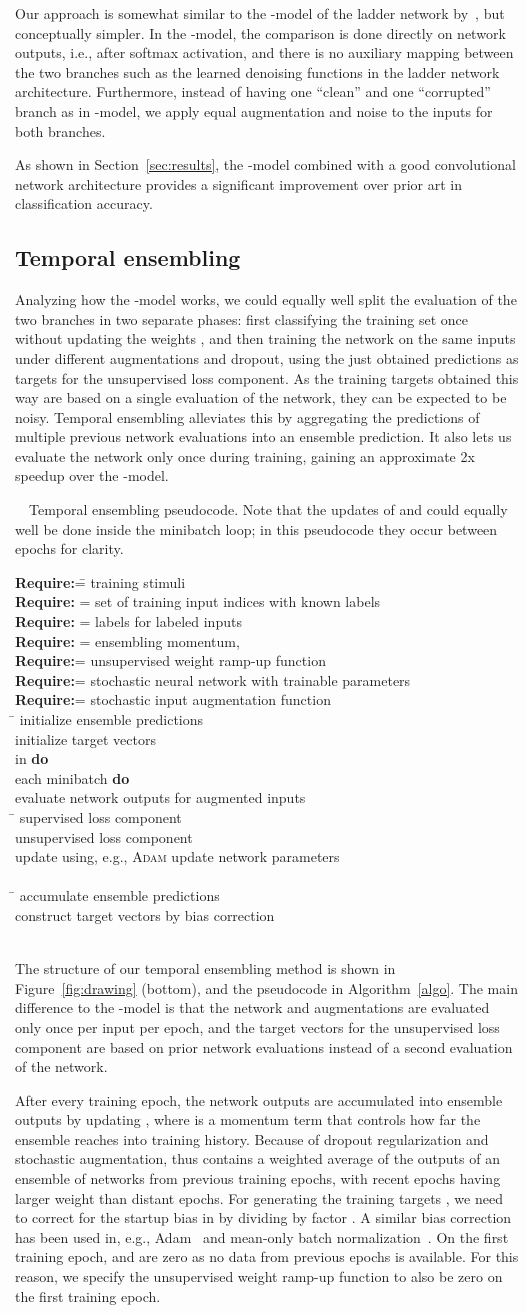 \documentclass{article}
\newcommand{\Req}{\textbf{Require:}\hspace*{0.5em}}
\newcommand{\X}{\hspace*{3mm}}
\newcommand{\XX}{\X\X}
\newcommand{\XXX}{\X\X\X}
\newcommand{\cm}[1]{ #1}
\newcommand{\figalgo}{
\begin{algorithm}[t]
\caption{\label{algo}\ \ 
Temporal ensembling pseudocode. 
Note that the updates of  and  could equally well
be done inside the minibatch loop; in this pseudocode they occur between epochs for clarity.
}
\begin{tabbing}
\Req          \= = training stimuli \hspace*{25mm} \= \\
\Req            \> = set of training input indices with known labels \\
\Req          \> = labels for labeled inputs  \\
\Req       \> = ensembling momentum,  \\
\Req            = unsupervised weight ramp-up function \\
\Req     = stochastic neural network with trainable parameters  \\
\Req            = stochastic input augmentation function \\
\X     \=  \hspace*{5mm}                   \>   \cm{initialize ensemble predictions} \\
\X  \>                                  \>   \cm{initialize target vectors} \\
\X {\bf for}  in  {\bf do} \\
\XX {\bf for} each minibatch  {\bf do} \\
\XXX                            \>\> \cm{evaluate network outputs for augmented inputs} \\
\XXX \=  \>   \cm{supervised loss component} \\
\XXX \>                  \>   \cm{unsupervised loss component} \\
\XXX update  using, e.g., \textsc{Adam}                                \>\> \cm{update network parameters} \\
\XX {\bf end for} \\
\XX \=                                      \>   \cm{accumulate ensemble predictions} \\
\XX \>                                       \>   \cm{construct target vectors by bias correction} \\
\X {\bf end for}\\
\X {\bf return} 
\end{tabbing}
\vspace*{-1.5mm}
\end{algorithm}
}
\begin{document}
Our approach is somewhat similar to the -model of the ladder network by~\cite{ladder}, but
conceptually simpler. In the -model, the comparison is done directly on network
outputs, i.e., after softmax activation, and there is no auxiliary mapping between the two branches such as
the learned denoising functions in the ladder network architecture.
Furthermore, instead of having one ``clean'' and one ``corrupted'' branch as in -model, we apply
equal augmentation and noise to the inputs for both branches.

As shown in Section~\ref{sec:results}, the -model combined with a good convolutional
network architecture provides a significant improvement over prior art in classification
accuracy.

\subsection{Temporal ensembling}
\label{sec:tempo}

Analyzing how the -model works, we could equally well split the evaluation of the two branches
in two separate phases: first classifying the training set once without updating the weights ,
and then training the network on the same inputs under different augmentations and dropout, using
the just obtained predictions as targets for the unsupervised loss component. As the training targets
obtained this way are based on a single evaluation of the network, they can be expected to be noisy.
Temporal ensembling alleviates this by aggregating the predictions of multiple previous network evaluations
into an ensemble prediction. It also lets us evaluate the network only once during training, gaining
an approximate 2x speedup over the -model.

\figalgo

The structure of our temporal ensembling method is shown in Figure~\ref{fig:drawing} (bottom), and the pseudocode in Algorithm~\ref{algo}.
The main difference
to the -model is that the network and augmentations are evaluated only once per input per epoch, 
and the target vectors  for the unsupervised loss component are based on prior network evaluations
instead of a second evaluation of the network.

After every training epoch, the network outputs  are accumulated into ensemble 
outputs  by updating , where  is a momentum term that
controls how far the ensemble reaches into training history. 
Because of dropout regularization and stochastic augmentation,  thus contains a weighted 
average of the outputs of an ensemble of networks  from previous training epochs, with recent 
epochs having larger weight than distant epochs. For generating the training targets ,
we need to correct for the startup bias in  by dividing by factor .
A similar bias correction has been used in, e.g., Adam~\citep{adam} and mean-only batch normalization~\citep{Salimans16}.
On the first training epoch,  and  are zero as no data from previous epochs is available.
For this reason, we specify the unsupervised weight ramp-up function  to also be zero on the 
first training epoch.
\end{document}
